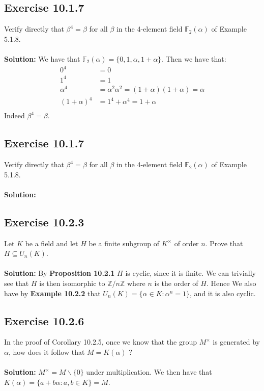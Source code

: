 \documentclass{article}
\begin{document}
\subsection*{Exercise 10.1.7}
Verify directly that $\beta^4 = \beta$ for all $\beta$ in the 4-element field $\mathbb{F}_2(\alpha)$ of Example 5.1.8. 
\\\\
\textbf{Solution:}
We have that $\mathbb{F}_2(\alpha) = \{0, 1, \alpha, 1+\alpha\}$. Then we have that:
\begin{equation*}
    \begin{aligned}
        0^4 &= 0\\
        1^4 &= 1\\
        \alpha^4 &= \alpha^2\alpha^2 = (1+\alpha)(1+\alpha) = \alpha\\
        (1+\alpha)^4 &= 1^4 + \alpha^4 = 1 + \alpha \\
    \end{aligned}
\end{equation*}
Indeed $\beta^4 = \beta$.

\subsection*{Exercise 10.1.7}
Verify directly that $\beta^4 = \beta$ for all $\beta$ in the 4-element field $\mathbb{F}_2(\alpha)$ of Example 5.1.8. 
\\\\
\textbf{Solution:}

\subsection*{Exercise 10.2.3}
Let $K$ be a field and let $H$ be a finite subgroup of $K^{\times}$ of order $n$.
Prove that $H \subseteq U_n(K)$.
\\\\
\textbf{Solution:}
By \textbf{Proposition 10.2.1} $H$ is cyclic, since it is finite. We can trivially see that $H$ is then isomorphic to $\mathbb{Z}/n\mathbb{Z}$ where $n$
is the order of $H$. 
Hence  We also have by \textbf{Example 10.2.2} that
$U_n(K) = \{\alpha \in  K: \alpha^n= 1\}$, and it is also cyclic.

\subsection*{Exercise 10.2.6}
In the proof of Corollary 10.2.5, once we know that the group $M^\times$ is generated by $\alpha$,
how does it follow that $M=K(\alpha)$ ?
\\\\
\textbf{Solution:}
$M^\times = M\backslash\{0\}$ under multiplication.
We then have that  $K(\alpha) = \{ a + b \alpha :  a,b \in K\} = M$.
 
\end{document}
